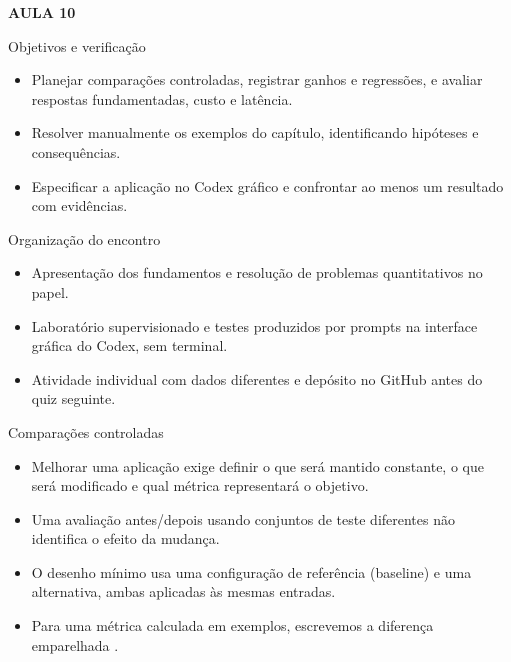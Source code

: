 \documentclass[10pt,aspectratio=169]{beamer}
\begin{document}
\begin{frame}[t]{}
\vspace{14mm}\textcolor{InsperRed}{\bfseries AULA 10}\par\vspace{4mm}{\LARGE\bfseries Avaliação experimental de aplicações de IA}\par\vspace{6mm}{\large Operações empresariais}\par{}
\end{frame}

\begin{frame}[t]{Objetivos e verificação}
\small
\begin{itemize}
\item Planejar comparações controladas, registrar ganhos e regressões, e avaliar respostas fundamentadas, custo e latência.
\item Resolver manualmente os exemplos do capítulo, identificando hipóteses e consequências.
\item Especificar a aplicação no Codex gráfico e confrontar ao menos um resultado com evidências.
\end{itemize}
\end{frame}

\begin{frame}[t]{Organização do encontro}
\small
\begin{itemize}
\item Apresentação dos fundamentos e resolução de problemas quantitativos no papel.
\item Laboratório supervisionado e testes produzidos por prompts na interface gráfica do Codex, sem terminal.
\item Atividade individual com dados diferentes e depósito no GitHub antes do quiz seguinte.
\end{itemize}
\end{frame}

\begin{frame}[t]{Comparações controladas}
\small
\begin{itemize}
\item Melhorar uma aplicação exige definir o que será mantido constante, o que será modificado e qual métrica representará o objetivo.
\item Uma avaliação antes/depois usando conjuntos de teste diferentes não identifica o efeito da mudança.
\item O desenho mínimo usa uma configuração de referência (baseline) e uma alternativa, ambas aplicadas às mesmas entradas.
\item Para uma métrica calculada em exemplos, escrevemos a diferença emparelhada .
\end{itemize}
\end{frame}
\end{document}

